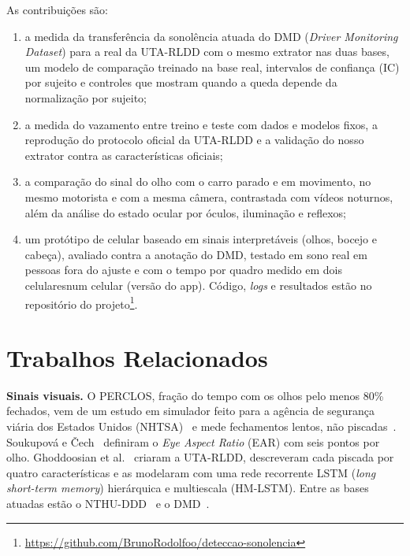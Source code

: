 \documentclass[conference]{IEEEtran}
\newif\ifMesmaVersaoApp
\begin{document}
As contribuições são:
\begin{enumerate}
\item a medida da transferência da sonolência atuada do DMD (\emph{Driver Monitoring Dataset}) para a real da UTA-RLDD com o mesmo extrator nas duas bases, um modelo de comparação treinado na base real, intervalos de confiança (IC) por sujeito e controles que mostram quando a queda depende da normalização por sujeito;
\item a medida do vazamento entre treino e teste com dados e modelos fixos, a reprodução do protocolo oficial da UTA-RLDD e a validação do nosso extrator contra as características oficiais;
\item a comparação do sinal do olho com o carro parado e em movimento, no mesmo motorista e com a mesma câmera, contrastada com vídeos noturnos, além da análise do estado ocular por óculos, iluminação e reflexos;
\item um protótipo de celular baseado em sinais interpretáveis (olhos, bocejo e cabeça), avaliado contra a anotação do DMD, testado em sono real em \AppUTASujeitos{} pessoas fora do ajuste e com o tempo por quadro medido \ifSamsungMedido em dois celulares\ifMesmaVersaoApp{} (versão \CelularIPhoneVersaoApp{} do app)\fi\else num celular (versão \CelularIPhoneVersaoApp{} do app)\fi. Código, \emph{logs} e resultados estão no repositório do projeto\footnote{\url{https://github.com/BrunoRodolfoo/deteccao-sonolencia}}.
\end{enumerate}

\section{Trabalhos Relacionados}
\label{sec:rel}

\textbf{Sinais visuais.} O PERCLOS, fração do tempo com os olhos pelo menos 80\% fechados, vem de um estudo em simulador feito para a agência de segurança viária dos Estados Unidos (NHTSA)~\cite{wierwille1994} e mede fechamentos lentos, não piscadas~\cite{dinges1998}. Soukupová e \v{C}ech~\cite{soukupova2016} definiram o \emph{Eye Aspect Ratio} (EAR) com seis pontos por olho. Ghoddoosian et al.~\cite{ghoddoosian2019} criaram a UTA-RLDD, descreveram cada piscada por quatro características e as modelaram com uma rede recorrente LSTM (\emph{long short-term memory}) hierárquica e multiescala (HM-LSTM). Entre as bases atuadas estão o NTHU-DDD~\cite{weng2016} e o DMD~\cite{ortega2020}.
\end{document}
